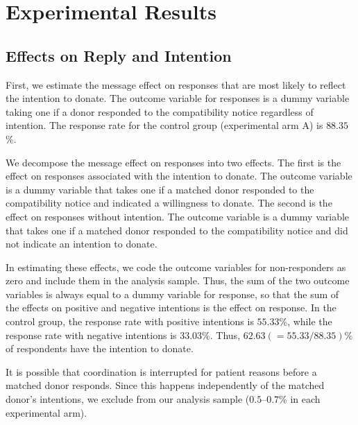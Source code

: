 \documentclass[
]{article}
\begin{document}
\hypertarget{result}{%
\section{Experimental Results}\label{result}}

\hypertarget{intention}{%
\subsection{Effects on Reply and Intention}\label{intention}}

First, we estimate the message effect on responses that are most likely to reflect the intention to donate. The outcome variable for responses is a dummy variable taking one if a donor responded to the compatibility notice regardless of intention. The response rate for the control group (experimental arm A) is \(88.35\)\%.

We decompose the message effect on responses into two effects. The first is the effect on responses associated with the intention to donate. The outcome variable is a dummy variable that takes one if a matched donor responded to the compatibility notice and indicated a willingness to donate. The second is the effect on responses without intention. The outcome variable is a dummy variable that takes one if a matched donor responded to the compatibility notice and did not indicate an intention to donate.

In estimating these effects, we code the outcome variables for non-responders as zero and include them in the analysis sample. Thus, the sum of the two outcome variables is always equal to a dummy variable for response, so that the sum of the effects on positive and negative intentions is the effect on response. In the control group, the response rate with positive intentions is \(55.33\)\%, while the response rate with negative intentions is \(33.03\)\%. Thus, \(62.63(=55.33/88.35)\)\% of respondents have the intention to donate.

It is possible that coordination is interrupted for patient reasons before a matched donor responds. Since this happens independently of the matched donor's intentions, we exclude from our analysis sample (\(0.5\)--\(0.7\)\% in each experimental arm).
\end{document}

